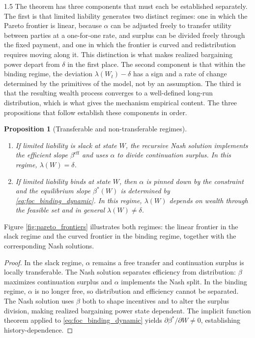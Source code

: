 \documentclass[12pt]{article}
\newtheorem{proposition}{Proposition}[section]
\theoremstyle{definition}
\theoremstyle{plain}
\begin{document}
\begin{spacing}{1.5}
The theorem has three components that must each be established separately. The first is that limited liability generates two distinct regimes: one in which the Pareto frontier is linear, because $\alpha$ can be adjusted freely to transfer utility between parties at a one-for-one rate, and surplus can be divided freely through the fixed payment, and one in which the frontier is curved and redistribution requires moving along it. This distinction is what makes realized bargaining power depart from $\delta$ in the first place. The second component is that within the binding regime, the deviation $\lambda(W_t) - \delta$ has a sign and a rate of change determined by the primitives of the model, not by an assumption. The third is that the resulting wealth process converges to a well-defined long-run distribution, which is what gives the mechanism empirical content. The three propositions that follow establish  these components in order.

\begin{proposition}[Transferable and non-transferable regimes]\label{prop:tu_ntu}
\begin{enumerate}
\item If limited liability is slack at state $W$, the recursive Nash solution implements the efficient slope $\beta^{\mathrm{eff}}$ and uses $\alpha$ to divide continuation surplus. In this regime, $\lambda(W)=\delta$.
\item If limited liability binds at state $W$, then $\alpha$ is pinned down by the constraint and the equilibrium slope $\beta^*(W)$ is determined by \eqref{eq:foc_binding_dynamic}. In this regime, $\lambda(W)$ depends on wealth through the feasible set and in general $\lambda(W)\neq\delta$.
\end{enumerate}
\end{proposition}

Figure \ref{fig:pareto_frontiers} illustrates both regimes: the linear frontier in the slack regime and the curved frontier in the binding regime, together with the corresponding Nash solutions.

\begin{proof}
In the slack regime, $\alpha$ remains a free transfer and continuation surplus is locally transferable. The Nash solution separates efficiency from distribution: $\beta$ maximizes continuation surplus and $\alpha$ implements the Nash split. In the binding regime, $\alpha$ is no longer free, so distribution and efficiency cannot be separated. The Nash solution uses $\beta$ both to shape incentives and to alter the surplus division, making realized bargaining power state dependent. The implicit function theorem applied to \eqref{eq:foc_binding_dynamic} yields $\partial\beta^*/\partial W\neq 0$, establishing history-dependence.
\end{proof}


\end{spacing}
\end{document}
